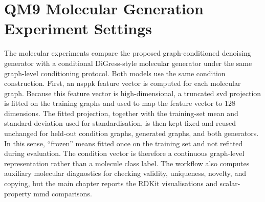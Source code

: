 \clearpage
\section{QM9 Molecular Generation Experiment Settings}
\label{app:qm9-molecular-settings}

The molecular experiments compare the proposed graph-conditioned denoising
generator with a conditional DiGress-style molecular generator under the same
graph-level conditioning protocol. Both models use the same condition
construction. First, an \gls{nsppk} feature vector is computed for each
molecular graph. Because this feature vector is high-dimensional, a truncated
\gls{svd} projection is fitted on the training graphs and used to map the
feature vector to \(128\) dimensions. The fitted projection, together with the
training-set mean and standard deviation used for standardisation, is then kept
fixed and reused unchanged for held-out condition graphs, generated graphs, and
both generators. In this sense, ``frozen'' means fitted once on the training
set and not refitted during evaluation. The condition vector is therefore a
continuous graph-level representation rather than a molecule class label. The
workflow also computes auxiliary molecular diagnostics for checking validity,
uniqueness, novelty, and copying, but the main chapter reports the RDKit
visualisations and scalar-property \gls{mmd} comparisons.


